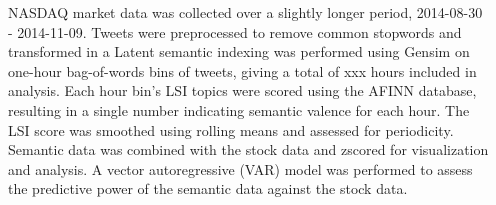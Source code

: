 \documentclass[17pt, a1paper, portrait, margin=0mm, innermargin=1mm,
     blockverticalspace=3mm, colspace=5mm, subcolspace=5mm]{tikzposter} %
\begin{document}
\begin{columns}
{    %
     \begin{tikzfigure} \label{fig:keywords}
     \end{tikzfigure}
     NASDAQ market data was collected over a slightly longer period, 2014-08-30
     - 2014-11-09. Tweets were preprocessed to remove common stopwords and
     transformed in a Latent semantic indexing
     was performed using Gensim \cite{rehurek_lrec}  on one-hour bag-of-words bins of
     tweets, giving a total of xxx hours included in analysis. Each hour bin's
     LSI topics were scored using the AFINN database, resulting in a single
     number indicating semantic valence for each hour. The LSI score was
     smoothed using rolling means and assessed
     for periodicity.  Semantic data was combined with the stock data and
     zscored for
     visualization and analysis. A vector autoregressive (VAR) model was
     performed to assess the predictive power of the semantic data against the
     stock data.

}
\end{columns}
\end{document}
